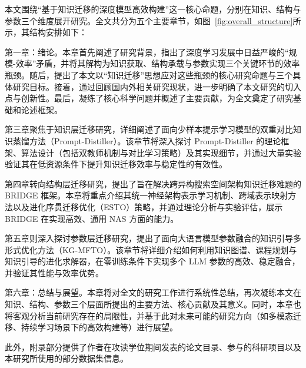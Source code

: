 \documentclass[../main.tex]{subfiles}
\begin{document}
本文围绕“基于知识迁移的深度模型高效构建”这一核心命题，分别在知识、结构与参数三个维度展开研究。全文共分为五个主要章节，如图~\ref{fig:overall_structure}所示，其结构安排如下：

第一章：绪论。本章首先阐述了研究背景，指出了深度学习发展中日益严峻的“规模-效率”矛盾，并将其解构为知识获取、结构承载与参数实现三个关键环节的效率瓶颈。随后，提出了本文以“知识迁移”思想应对这些瓶颈的核心研究命题与三个具体研究目标。接着，通过回顾国内外相关研究现状，进一步明确了本文研究的切入点与创新性。最后，凝练了核心科学问题并概述了主要贡献，为全文奠定了研究基础和论述框架。

第三章聚焦于知识层迁移研究，详细阐述了面向少样本提示学习模型的双重对比知识蒸馏方法（Prompt-Distiller）。该章节将深入探讨 Prompt-Distiller 的理论框架、算法设计（包括双教师机制与对比学习策略）及其实现细节，并通过大量实验验证其在低资源条件下提升知识迁移效率与稳定性的有效性。

第四章转向结构层迁移研究，提出了旨在解决跨异构搜索空间架构知识迁移难题的 BRIDGE 框架。本章将重点介绍其统一神经架构表示学习机制、跨域表示映射方法以及进化序贯迁移优化（ESTO）策略，并通过理论分析与实验评估，展示 BRIDGE 在实现高效、通用 NAS 方面的能力。

第五章则深入探讨参数层迁移研究，提出了面向大语言模型参数融合的知识引导多形式优化方法（KG-MFTO）。该章节将详细介绍如何利用知识图谱、课程规划与知识引导的进化求解器，在零训练条件下实现多个 LLM 参数的高效、稳定融合，并验证其性能与效率优势。

第六章：总结与展望。本章将对全文的研究工作进行系统性总结，再次凝练本文在知识、结构、参数三个层面所提出的主要方法、核心贡献及其意义。同时，本章也将客观分析当前研究存在的局限性，并基于此对未来可能的研究方向（如多模态迁移、持续学习场景下的高效构建等）进行展望。

此外，附录部分提供了作者在攻读学位期间发表的论文目录、参与的科研项目以及本研究所使用的部分数据集信息。
\end{document}
